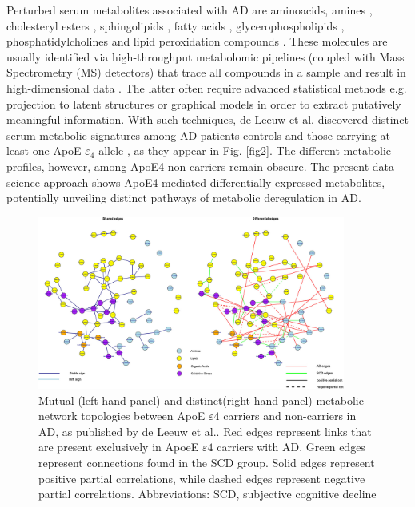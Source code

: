 \documentclass{amsart}
\begin{document}
Perturbed serum metabolites associated with AD are aminoacids, amines \cite{deLeeuw2017Blood-basedDisease, Green2023InvestigatingDisease}, cholesteryl esters \cite{Proitsi2017AssociationAnalysis}, sphingolipids \cite{Varma2018BrainStudy,Sun2022AssociationDisease,Green2023InvestigatingDisease,Oeckl2019GlialImpairment,Barupal2019SetsPathophysiology}, fatty acids \cite{Fernandez-Calle2022APOEDiseases,deLeeuw2017Blood-basedDisease}, glycerophospholipids \cite{Varma2018BrainStudy, Jia2022ATypes,Huo2020BrainAnalysis, Weng2019TheImpairment}, phosphatidylcholines \cite{Simpson2016BloodAging} and lipid peroxidation compounds \cite{Fernandez-Calle2022APOEDiseases}. These molecules are usually identified via high-throughput metabolomic pipelines (coupled with Mass Spectrometry (MS) detectors) that trace all compounds in a sample and result in high-dimensional data \cite{Oka2023MultiomicsCohort}. The latter often require advanced statistical methods e.g. projection to latent structures \cite{Weng2019TheImpairment, Peeters2019StableData} or graphical models \cite{Peeters2022Rags2ridges:Matrices} in order to extract putatively meaningful information. 
With such techniques, de Leeuw et al. discovered distinct serum metabolic signatures among AD patients-controls and those carrying at least one ApoE $\varepsilon_4$ allele \cite{deLeeuw2017Blood-basedDisease}, as they appear in Fig. \ref{fig2}. The different metabolic profiles, however, among ApoE4 non-carriers remain obscure. The present data science approach shows ApoE4-mediated differentially expressed metabolites, potentially unveiling distinct pathways of metabolic deregulation in AD.

\begin{figure}[htb]
\vspace*{-0.2cm}
  \includegraphics[width=0.9\textwidth]{figures/network.jpeg}
    \caption{Mutual (left-hand panel) and distinct(right-hand panel) metabolic network topologies between ApoE $\varepsilon4$ carriers and non-carriers in AD, as published by de Leeuw et al.. Red edges represent links that are present exclusively in ApoeE $\varepsilon4$ carriers with AD. Green edges represent connections found in the SCD group. Solid edges represent positive partial correlations, while dashed edges represent negative partial correlations. Abbreviations: SCD, subjective cognitive decline }
  \label{fig3}
\end{figure}
\end{document}
